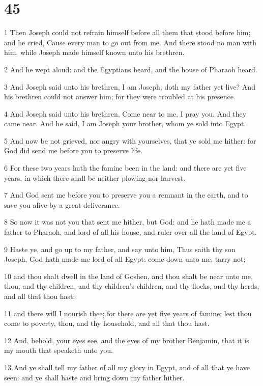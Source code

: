 \chapter{45}

\par 1 Then Joseph could not refrain himself before all them that stood before him; and he cried, Cause every man to go out from me. And there stood no man with him, while Joseph made himself known unto his brethren.
\par 2 And he wept aloud: and the Egyptians heard, and the house of Pharaoh heard.
\par 3 And Joseph said unto his brethren, I am Joseph; doth my father yet live? And his brethren could not answer him; for they were troubled at his presence.
\par 4 And Joseph said unto his brethren, Come near to me, I pray you. And they came near. And he said, I am Joseph your brother, whom ye sold into Egypt.
\par 5 And now be not grieved, nor angry with yourselves, that ye sold me hither: for God did send me before you to preserve life.
\par 6 For these two years hath the famine been in the land: and there are yet five years, in which there shall be neither plowing nor harvest.
\par 7 And God sent me before you to preserve you a remnant in the earth, and to save you alive by a great deliverance.
\par 8 So now it was not you that sent me hither, but God: and he hath made me a father to Pharaoh, and lord of all his house, and ruler over all the land of Egypt.
\par 9 Haste ye, and go up to my father, and say unto him, Thus saith thy son Joseph, God hath made me lord of all Egypt: come down unto me, tarry not;
\par 10 and thou shalt dwell in the land of Goshen, and thou shalt be near unto me, thou, and thy children, and thy children's children, and thy flocks, and thy herds, and all that thou hast:
\par 11 and there will I nourish thee; for there are yet five years of famine; lest thou come to poverty, thou, and thy household, and all that thou hast.
\par 12 And, behold, your eyes see, and the eyes of my brother Benjamin, that it is my mouth that speaketh unto you.
\par 13 And ye shall tell my father of all my glory in Egypt, and of all that ye have seen: and ye shall haste and bring down my father hither.
